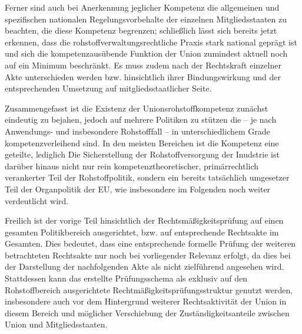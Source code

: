 \documentclass[12pt,a4paper,oneside]{book} %
\begin{document}
	Ferner sind auch bei Anerkennung jeglicher Kompetenz die allgemeinen und spezifischen nationalen Regelungsvorbehalte der einzelnen Mitgliedsstaaten zu beachten, die diese Kompetenz begrenzen; schließlich lässt sich bereits jetzt erkennen, dass die rohstoffverwaltungsrechtliche Praxis stark national geprägt ist und sich die kompetenzausübende Funktion der Union zumindest aktuell noch auf ein Minimum beschränkt. Es muss zudem nach der Rechtskraft einzelner Akte unterschieden werden bzw. hinsichtlich ihrer Bindungswirkung und der entsprechenden Umsetzung auf mitgliedsstaatlicher Seite.
	
	Zusammengefasst ist die Existenz der Unionsrohstoffkompetenz zunächst eindeutig zu bejahen, jedoch auf mehrere Politiken zu stützen die -- je nach Anwendungs- und insbesondere Rohstofffall -- in unterschiedlichem Grade kompetenzverleihend sind. In den meisten Bereichen ist die Kompetenz eine geteilte, lediglich %
	Die Sicherstellung der Rohstoffversorgung der Inudstrie ist darüber hinaus nicht nur rein kompetenztheoretischer, primärrechtlich verankerter Teil der Rohstoffpolitik, sondern ein bereits tatsächlich umgesetzer Teil der Organpolitik der EU, wie insbesondere im Folgenden noch weiter verdeutlicht wird.
	
Freilich ist der vorige Teil hinsichtlich der Rechtsmäßigkeitsprüfung auf einen gesamten Politikbereich ausgerichtet, bzw. auf entsprechende Rechtsakte im Gesamten. Dies bedeutet, dass eine entsprechende formelle Prüfung der weiteren betrachteten Rechtsakte nur noch bei vorliegender Relevanz erfolgt, da dies bei der Darstellung der nachfolgenden Akte als nicht zielführend angesehen wird. Stattdessen kann das erstellte Prüfungsschema als exklusiv auf den Rohstoffbereich ausgerichtete Rechtmäßigkeitsprüfungsstruktur genutzt werden, insbesondere auch vor dem Hintergrund weiterer Rechtsaktivität der Union in diesem Bereich und möglicher Verschiebung der Zuständigkeitsanteile zwischen Union und Mitgliedsstaaten.
	
	
\end{document}
